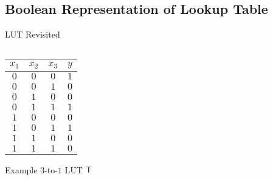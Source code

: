 \documentclass[../240906_cryptlab_flute.tex]{subfiles}
\begin{document}
\subsection{Boolean Representation of Lookup Table}

\begin{frame}{LUT Revisited}
    \def\onlyred{\only<2->{\color{red}}}
    \begin{columns}
        \begin{column}{0.4\textwidth}
            \centering
            \begin{table}[H]
                \centering
                \begin{tabular}{ccc|c}
                    \(x_1\)       & \(x_2\)       & \(x_3\)       & \(y\)         \\ \hline
                    \onlyred\(0\) & \onlyred\(0\) & \onlyred\(0\) & \onlyred\(1\) \\
                    \(0\)         & \(0\)         & \(1\)         & \(0\)         \\
                    \(0\)         & \(1\)         & \(0\)         & \(0\)         \\
                    \onlyred\(0\) & \onlyred\(1\) & \onlyred\(1\) & \onlyred\(1\) \\
                    \(1\)         & \(0\)         & \(0\)         & \(0\)         \\
                    \onlyred\(1\) & \onlyred\(0\) & \onlyred\(1\) & \onlyred\(1\) \\
                    \(1\)         & \(1\)         & \(0\)         & \(0\)         \\
                    \(1\)         & \(1\)         & \(1\)         & \(0\)
                \end{tabular}
            \end{table}
            Example \(3\)-to-\(1\) LUT \(\mathsf{T}\)
        \end{column}
        \pause
        \begin{column}{0.4\textwidth}
            \small
            \centering
\end{column}
\end{columns}
\end{frame}
\end{document}
